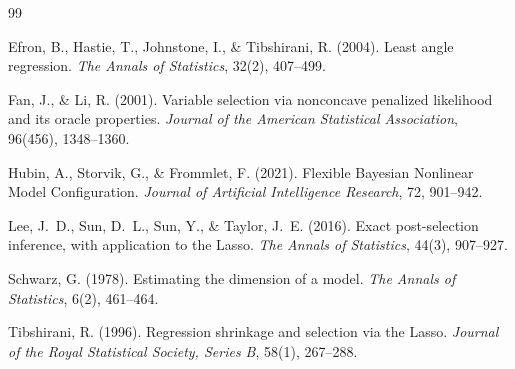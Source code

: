 \documentclass[12pt,a4paper]{article}
\begin{document}

\begin{thebibliography}{99}

Efron, B., Hastie, T., Johnstone, I., \& Tibshirani, R. (2004).
Least angle regression.
\textit{The Annals of Statistics}, 32(2), 407--499.

Fan, J., \& Li, R. (2001).
Variable selection via nonconcave penalized likelihood and its oracle
properties.
\textit{Journal of the American Statistical Association}, 96(456), 1348--1360.

Hubin, A., Storvik, G., \& Frommlet, F. (2021).
Flexible Bayesian Nonlinear Model Configuration.
\textit{Journal of Artificial Intelligence Research}, 72, 901--942.

Lee, J.~D., Sun, D.~L., Sun, Y., \& Taylor, J.~E. (2016).
Exact post-selection inference, with application to the Lasso.
\textit{The Annals of Statistics}, 44(3), 907--927.

Schwarz, G. (1978).
Estimating the dimension of a model.
\textit{The Annals of Statistics}, 6(2), 461--464.

Tibshirani, R. (1996).
Regression shrinkage and selection via the Lasso.
\textit{Journal of the Royal Statistical Society, Series B}, 58(1), 267--288.

\end{thebibliography}
\end{document}
